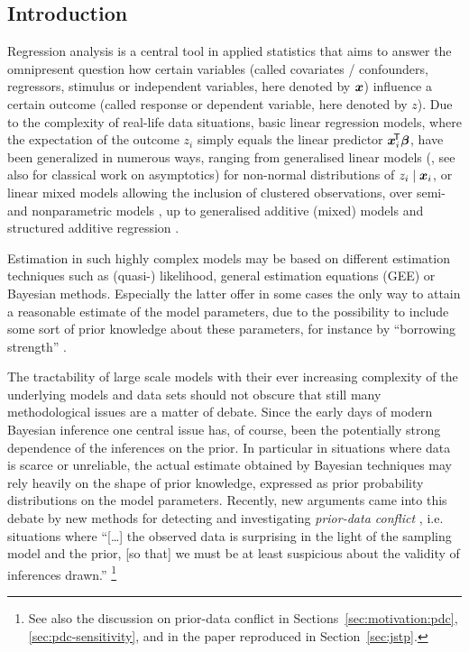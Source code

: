 \subsection{Introduction}
\label{sec:festschrift-intro}

Regression analysis is a central tool in applied statistics that
aims to answer the omnipresent question how certain variables
(called covariates / confounders, regressors, stimulus or
independent variables, here denoted by ${\bm x}$) influence a certain
outcome (called response or dependent variable, here denoted by $z$).
Due to the complexity of real-life data situations, basic linear
regression models, where the expectation of the outcome $z_i$ simply equals the linear predictor ${\bm x}_i^{{\mbox{\!\scriptsize\textsf{T}}}}\boldsymbol{\beta}$,
have been generalized in numerous ways, ranging from generalised linear
models (\cite{2001:fahrmeier-tutz}, see also \cite{1985:fahrmeir-kaufmann} for classical work on asymptotics)
for non-normal distributions of $z_i\mid {\bm x}_i$, or linear mixed models %
allowing the inclusion of clustered observations, over semi- and nonparametric models
\parencite{2009:kauermann,2007:fahrmeir,2007:scheipl}, up to
generalised additive (mixed) models and structured
additive regression \parencite{2009:fahrmeir,2006:fahrmeir,2007:kneib}.

Estimation in such highly complex models may be based on
different estimation techniques such as (quasi-) likelihood, general
estimation equations (GEE) or Bayesian methods. Especially the
latter offer in some cases the only way to attain a reasonable
estimate of the model parameters, due to the possibility to include
some sort of prior knowledge about these parameters, for instance by
``borrowing strength'' \parencite[e.g.,][]{1996:higgins}.

The tractability of large scale models with their ever increasing complexity
of the underlying models and data sets should not obscure that
still many methodological issues are a matter of debate.
Since the early days of modern Bayesian inference one central issue has,
of course, been the potentially strong dependence of the inferences on the prior.
In particular in situations where data is scarce or unreliable, the
actual estimate obtained by Bayesian techniques may rely heavily on
the shape of prior knowledge, expressed as prior probability
distributions on the model parameters. %
Recently, new arguments came into this debate by new methods
for detecting and investigating \emph{prior-data conflict} \parencite{2006:evans,2008:bousquet},
i.e. situations where  ``[\ldots] the observed data is surprising
in the light of the sampling model and the prior,
[so that] we must be at least suspicious about the validity
of inferences drawn.'' \parencite[p.~893]{2006:evans}%
\footnote{See also the discussion on prior-data conflict in
Sections~\ref{sec:motivation:pdc}, \ref{sec:pdc-sensitivity},
and in the paper reproduced in Section~\ref{sec:jstp}.}

